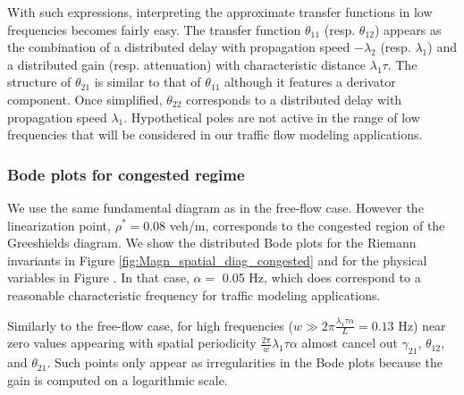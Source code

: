 \documentclass[5p,twocolumn]{elsarticle}
\begin{document}
With such expressions, interpreting the approximate transfer functions in low frequencies becomes fairly easy.
The transfer function $\theta_{11}$ (resp. $\theta_{12}$) appears as the combination of a distributed delay with propagation speed $-\lambda_{2}$ (resp. $\lambda_{1}$) and a distributed gain (resp. attenuation) with characteristic distance $\lambda_{1}\tau$.
The structure of $\theta_{21}$ is similar to that of $\theta_{11}$ although it features a derivator component.
Once simplified, $\theta_{22}$ corresponds to a distributed delay with propagation speed $\lambda_{1}$.
Hypothetical poles are not active in the range of low frequencies that will be considered in our traffic flow modeling applications.

\subsubsection{Bode plots for congested regime}
We use the same fundamental diagram as in the free-flow case. However the linearization point, $\rho^* = 0.08$ veh/m, corresponds to the congested region of the Greeshields diagram. We show the distributed Bode plots for the Riemann invariants in Figure \ref{fig:Magn_spatial_diag_congested} and for the physical variables in Figure . In that case, $\alpha =$ 0.05 Hz, which does correspond to a reasonable characteristic frequency for traffic modeling applications.

Similarly to the free-flow case, for high frequencies ($w \gg 2 \pi \frac{\lambda_{1} \tau \alpha}{L} = 0.13$ Hz) near zero values appearing with spatial periodicity $\frac{2 \pi}{w} \lambda_{1} \tau \alpha$ almost cancel out $\gamma_{21}$, $\theta_{12}$, and $\theta_{21}$. Such points only appear as irregularities in the Bode plots because the gain is computed on a logarithmic scale.
\end{document}
